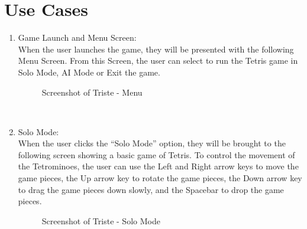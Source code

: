 \documentclass[conference]{IEEEtran}
\begin{document}
\section{Use Cases}
\begin{enumerate}
    \item Game Launch and Menu Screen: \\
When the user launches the game, they will be presented with the following Menu Screen. From this Screen, the user can select to run the Tetris game in Solo Mode, AI Mode or Exit the game.
\begin{figure}[htbp]
\centering
    \caption{Screenshot of Triste - Menu}
    \label{fig:Display}
\end{figure} \\

\item Solo Mode: \\
When the user clicks the “Solo Mode” option, they will be brought to the following screen showing a basic game of Tetris. To control the movement of the Tetrominoes, the user can use the Left and Right arrow keys to move the game pieces, the Up arrow key to rotate the game pieces, the Down arrow key to drag the game pieces down slowly, and the Spacebar to drop the game pieces.
\begin{figure}[htbp]
\centering
    \caption{Screenshot of Triste - Solo Mode}
    \label{fig:Display}
\end{figure} \\
\vspace{20pt}


\end{enumerate}
\end{document}

